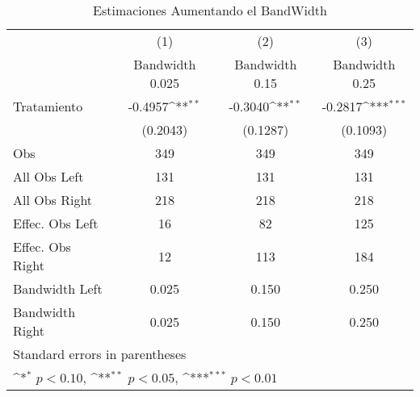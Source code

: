 \begin{table}[H]\centering  \fontsize{10}{4}\selectfont            \begin{threeparttable} \def\sym#1{\ifmmode^{#1}\else\(^{#1}\)\fi}            \caption{Estimaciones Aumentando el BandWidth}
\label{comparacion cut off}
\begin{tabular}{l*{3}c}
\hline
\hline
            &\multicolumn{1}{c}{(1)}&\multicolumn{1}{c}{(2)}&\multicolumn{1}{c}{(3)}\\
            &\multicolumn{1}{c}{Bandwidth 0.025}&\multicolumn{1}{c}{Bandwidth 0.15}&\multicolumn{1}{c}{Bandwidth 0.25}\\
\hline
Tratamiento &     -0.4957\sym{**} &     -0.3040\sym{**} &     -0.2817\sym{***}\\
            &    (0.2043)         &    (0.1287)         &    (0.1093)         \\
\hline
Obs         &         349         &         349         &         349         \\
All Obs Left&         131         &         131         &         131         \\
All Obs Right&         218         &         218         &         218         \\
Effec. Obs Left&          16         &          82         &         125         \\
Effec. Obs Right&          12         &         113         &         184         \\
Bandwidth Left&       0.025         &       0.150         &       0.250         \\
Bandwidth Right&       0.025         &       0.150         &       0.250         \\
\hline
\hline
\multicolumn{4}{l}{\footnotesize Standard errors in parentheses}\\
\multicolumn{5}{l}{\footnotesize \sym{*} \(p<0.10\), \sym{**} \(p<0.05\), \sym{***} \(p<0.01\)}\\
\end{tabular}
\begin{tablenotes}
\begin{footnotesize}
\end{footnotesize}
\end{tablenotes} \end{threeparttable} \end{table}
